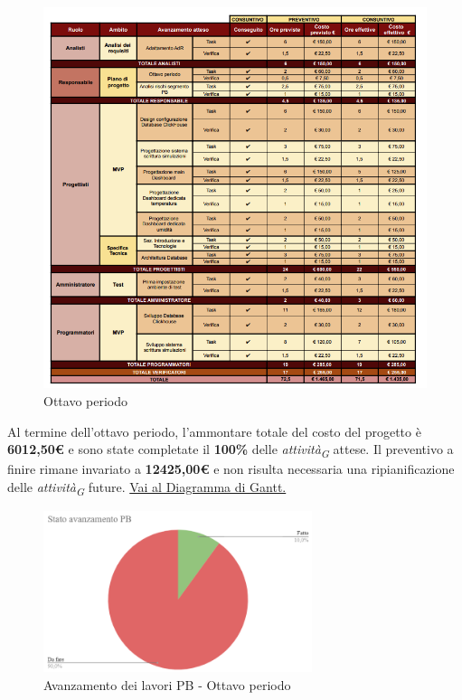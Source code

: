 \begin{figure}[H]
    \centering
    \includegraphics[height=1.1\textwidth]{../Images/tabG8.PNG}
    \caption{Ottavo periodo}
    \label{fig:Ottavo_periodo}
\end{figure}

Al termine dell'ottavo periodo, l'ammontare totale del costo del progetto è \textbf{6012,50\euro} e sono state completate il \textbf{100\%} delle \textit{attività}\textsubscript{\textit{G}} attese.
Il preventivo a finire rimane invariato a \textbf{12425,00\euro} e non risulta necessaria una ripianificazione delle \textit{attività}\textsubscript{\textit{G}} future.
\href{https://github.com/orgs/ByteOps-swe/projects/3/views/1?sortedBy%5Bdirection%5D=asc&sortedBy%5BcolumnId%5D=64182560}{Vai al Diagramma di Gantt.}

\begin{figure}[H]
    \centering
    \begin{minipage}[b]{0.70\textwidth}
        \centering
        \includegraphics[width=0.7\textwidth]{../Images/torta8.png}
        \caption{Avanzamento dei lavori PB - Ottavo periodo}
        \label{fig:Avanzamento_PB_8}
    \end{minipage}
\end{figure}

